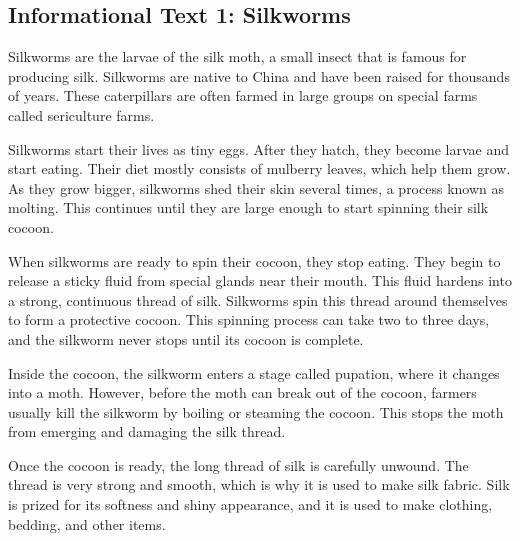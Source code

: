 \documentclass[12pt]{article}
\begin{document}
\onehalfspacing

\vspace{5cm}
\subsection*{Informational Text 1: Silkworms}

\begin{tcolorbox}[colframe=black!40, colback=gray!5]

\begin{spacing}{1.15}
    Silkworms are the larvae of the silk moth, a small insect that is famous for producing silk. Silkworms are native to China and have been raised for thousands of years. These caterpillars are often farmed in large groups on special farms called sericulture farms. 

    Silkworms start their lives as tiny eggs. After they hatch, they become larvae and start eating. Their diet mostly consists of mulberry leaves, which help them grow. As they grow bigger, silkworms shed their skin several times, a process known as molting. This continues until they are large enough to start spinning their silk cocoon.

    When silkworms are ready to spin their cocoon, they stop eating. They begin to release a sticky fluid from special glands near their mouth. This fluid hardens into a strong, continuous thread of silk. Silkworms spin this thread around themselves to form a protective cocoon. This spinning process can take two to three days, and the silkworm never stops until its cocoon is complete.

    Inside the cocoon, the silkworm enters a stage called pupation, where it changes into a moth. However, before the moth can break out of the cocoon, farmers usually kill the silkworm by boiling or steaming the cocoon. This stops the moth from emerging and damaging the silk thread.

    Once the cocoon is ready, the long thread of silk is carefully unwound. The thread is very strong and smooth, which is why it is used to make silk fabric. Silk is prized for its softness and shiny appearance, and it is used to make clothing, bedding, and other items.

\end{spacing}

\end{tcolorbox}

\vspace{1cm}
\end{document}
